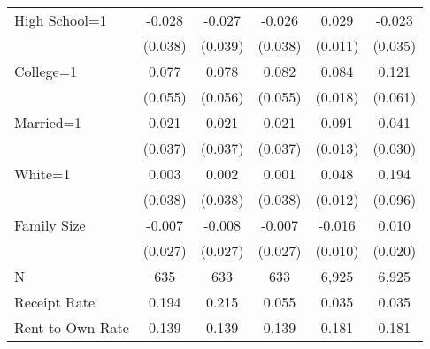 {\begin{tabular}{l*{5}{c}}
\;High School=1 &   -0.028         &   -0.027         &   -0.026         &    0.029\sym{*}  &   -0.023         \\
                &  (0.038)         &  (0.039)         &  (0.038)         &  (0.011)         &  (0.035)         \\
\;College=1     &    0.077         &    0.078         &    0.082         &    0.084\sym{***}&    0.121\sym{*}  \\
                &  (0.055)         &  (0.056)         &  (0.055)         &  (0.018)         &  (0.061)         \\
\;Married=1     &    0.021         &    0.021         &    0.021         &    0.091\sym{***}&    0.041         \\
                &  (0.037)         &  (0.037)         &  (0.037)         &  (0.013)         &  (0.030)         \\
\;White=1       &    0.003         &    0.002         &    0.001         &    0.048\sym{***}&    0.194\sym{*}  \\
                &  (0.038)         &  (0.038)         &  (0.038)         &  (0.012)         &  (0.096)         \\
\;Family Size   &   -0.007         &   -0.008         &   -0.007         &   -0.016         &    0.010         \\
                &  (0.027)         &  (0.027)         &  (0.027)         &  (0.010)         &  (0.020)         \\
\midrule
N               &      635         &      633         &      633         &    6,925         &    6,925         \\
Receipt Rate    &    0.194         &    0.215         &    0.055         &    0.035         &    0.035         \\
Rent-to-Own Rate&    0.139         &    0.139         &    0.139         &    0.181         &    0.181         \\
\bottomrule
\end{tabular}
}
